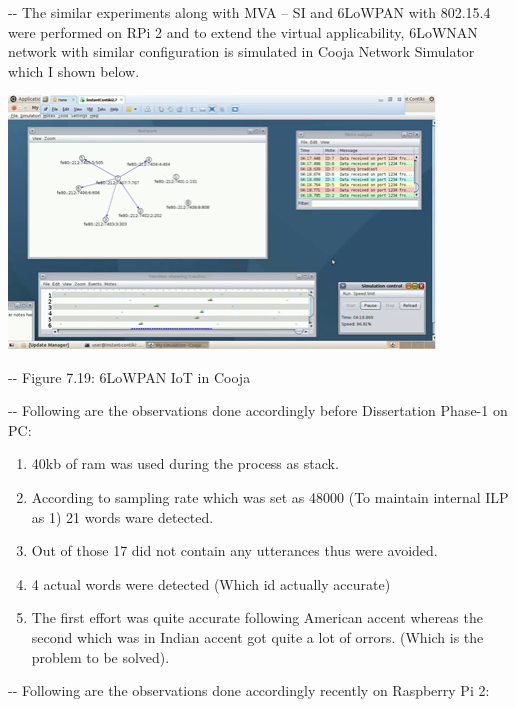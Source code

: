 \documentclass[12pt]{article}
\makeatletter
\newenvironment{indentation}[3]%
	{\par\setlength{\parindent}{#3}
	\setlength{\leftmargin}{#1}       \setlength{\rightmargin}{#2}%
	\advance\linewidth -\leftmargin       \advance\linewidth -\rightmargin%
	\advance\@totalleftmargin\leftmargin  \@setpar{{\@@par}}%
	\parshape 1\@totalleftmargin \linewidth\ignorespaces}{\par}%
\makeatother
\begin{document}
\begin{indentation}{0pt}{0pt}{0pt}
The similar experiments along with MVA -- SI and 6LoWPAN with 802.15.4 were
performed on RPi 2 and to extend the virtual applicability, 6LoWNAN network with
similar configuration is simulated in Cooja Network Simulator which I shown
below.
\end{indentation}
\includegraphics[width=322pt]{img-32.png}
\begin{center}
\begin{indentation}{0pt}{0pt}{0pt}
Figure 7.19: 6LoWPAN IoT in Cooja
\end{indentation}
\end{center}

\begin{indentation}{0pt}{0pt}{0pt}
Following are the observations done accordingly before Dissertation Phase-1 on
PC:
\end{indentation}

\begin{enumerate}
	\item 40kb of ram was used during the process as stack.
	\item According to sampling rate which was set as 48000 (To maintain internal ILP as
1) 21 words ware detected.
	\item Out of those 17 did not contain any utterances thus were avoided.
	\item 4 actual words were detected (Which id actually accurate)
	\item The first effort was quite accurate following American accent whereas the second
which was in Indian accent got quite a lot of orrors. (Which is the problem to be
solved).
\end{enumerate}

\begin{indentation}{0pt}{0pt}{0pt}
Following are the observations done accordingly recently on Raspberry Pi 2:
\end{indentation}
\end{document}
